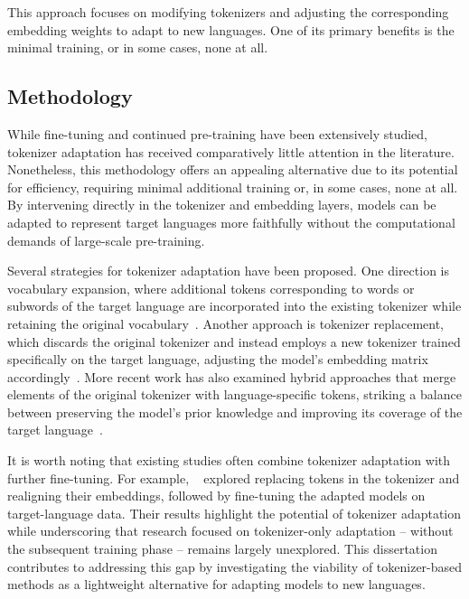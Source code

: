 This approach focuses on modifying tokenizers and adjusting the corresponding embedding weights to adapt to new languages. One of its primary benefits is the minimal training, or in some cases, none at all.

\subsection{Methodology}
While fine-tuning and continued pre-training have been extensively studied, tokenizer adaptation has received comparatively little attention in the literature. Nonetheless, this methodology offers an appealing alternative due to its potential for efficiency, requiring minimal additional training or, in some cases, none at all. By intervening directly in the tokenizer and embedding layers, models can be adapted to represent target languages more faithfully without the computational demands of large-scale pre-training.

Several strategies for tokenizer adaptation have been proposed. One direction is vocabulary expansion, where additional tokens corresponding to words or subwords of the target language are incorporated into the existing tokenizer while retaining the original vocabulary~\cite{fernandez2022fine}. Another approach is tokenizer replacement, which discards the original tokenizer and instead employs a new tokenizer trained specifically on the target language, adjusting the model’s embedding matrix accordingly~\cite{rust2020good}. More recent work has also examined hybrid approaches that merge elements of the original tokenizer with language-specific tokens, striking a balance between preserving the model’s prior knowledge and improving its coverage of the target language~\cite{csaki2023efficiently}.

It is worth noting that existing studies often combine tokenizer adaptation with further fine-tuning. For example, ~\citet{csaki2023efficiently} explored replacing tokens in the tokenizer and realigning their embeddings, followed by fine-tuning the adapted models on target-language data. Their results highlight the potential of tokenizer adaptation while underscoring that research focused on tokenizer-only adaptation -- without the subsequent training phase -- remains largely unexplored. This dissertation contributes to addressing this gap by investigating the viability of tokenizer-based methods as a lightweight alternative for adapting models to new languages.


